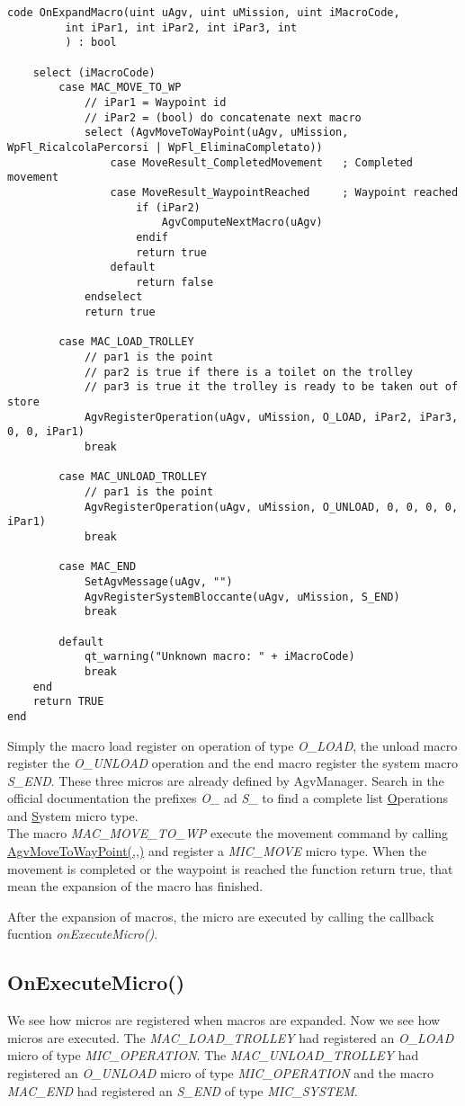 \begin{lstlisting}[caption=onExpandMacro(), label=lstonExpandMacro]
code OnExpandMacro(uint uAgv, uint uMission, uint iMacroCode,
		 int iPar1, int iPar2, int iPar3, int
		 ) : bool
		 
	select (iMacroCode)
		case MAC_MOVE_TO_WP
			// iPar1 = Waypoint id
			// iPar2 = (bool) do concatenate next macro
			select (AgvMoveToWayPoint(uAgv, uMission, WpFl_RicalcolaPercorsi | WpFl_EliminaCompletato))
				case MoveResult_CompletedMovement	; Completed movement
				case MoveResult_WaypointReached		; Waypoint reached
					if (iPar2)
						AgvComputeNextMacro(uAgv)
					endif
					return true
				default
					return false
			endselect
			return true
		
		case MAC_LOAD_TROLLEY
			// par1 is the point
			// par2 is true if there is a toilet on the trolley
			// par3 is true it the trolley is ready to be taken out of store
			AgvRegisterOperation(uAgv, uMission, O_LOAD, iPar2, iPar3, 0, 0, iPar1)
			break
		
		case MAC_UNLOAD_TROLLEY
			// par1 is the point
			AgvRegisterOperation(uAgv, uMission, O_UNLOAD, 0, 0, 0, 0, iPar1)
			break
		
		case MAC_END
			SetAgvMessage(uAgv, "")
			AgvRegisterSystemBloccante(uAgv, uMission, S_END)
			break
		
		default
			qt_warning("Unknown macro: " + iMacroCode)
			break
	end
	return TRUE
end
\end{lstlisting}

Simply the macro load register on operation of type \textit{O\_LOAD}, the unload macro register the \textit{O\_UNLOAD} operation and the end macro register the system macro \textit{S\_END}. These three micros are already defined by AgvManager.
Search in the official documentation the prefixes \textit{O\_} ad \textit{S\_} to find a complete list \underline{O}perations  and \underline{S}ystem micro type.\\

The macro \textit{MAC\_MOVE\_TO\_WP} execute the movement command by calling \underline{AgvMoveToWayPoint(,,)} and register a \textit{MIC\_MOVE} micro type. When the movement is completed or the waypoint is reached the function return true, that mean the expansion of the macro has finished.

After the expansion of macros, the micro are executed by calling the callback fucntion \textit{onExecuteMicro()}.

\subsection*{OnExecuteMicro()}
We see how micros are registered when macros are expanded. Now we see how micros are executed.
The \textit{MAC\_LOAD\_TROLLEY} had registered an \textit{O\_LOAD} micro of type \textit{MIC\_OPERATION}.
The \textit{MAC\_UNLOAD\_TROLLEY} had registered an \textit{O\_UNLOAD} micro of type \textit{MIC\_OPERATION} and the macro \textit{MAC\_END} had registered an \textit{S\_END} of type \textit{MIC\_SYSTEM}.

